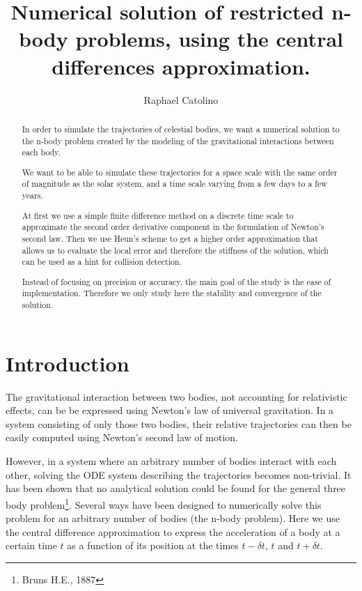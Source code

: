 \documentclass[a4paper,11pt]{article}
\author{Raphael Catolino}
\title{Numerical solution of restricted n-body problems, using
the central differences approximation.}
\begin{document}
\maketitle

\begin{abstract}
  In order to simulate the trajectories of celestial bodies,
  we want a numerical solution to the n-body problem created
  by the modeling of the gravitational interactions between each body.

  We want to be able to simulate these trajectories for a space scale
  with the same order of magnitude as the solar system, and a time scale
  varying from a few days to a few years.

  At first we use a simple finite difference method on a discrete time scale
  to approximate the second order derivative component in the formulation
  of Newton's second law. Then we use Heun's scheme to get a higher order
  approximation that allows us to evaluate the local error and therefore
  the stiffness of the solution, which can be used as a hint for collision
  detection.

  Instead of focusing on precision or accuracy, the main goal of the
  study is the ease of implementation. Therefore we only study here the
  stability and convergence of the solution.
\end{abstract}
\newpage
\tableofcontents
\newpage

\section{Introduction}
The gravitational interaction between two bodies, not accounting for relativistic
effects, can be be expressed using Newton's law of universal gravitation.
In a system consisting of only those two bodies, their relative trajectories
can then be easily computed using Newton's second law of motion.

However, in a system where an arbitrary number of bodies
interact with each other, solving the ODE system describing the
trajectories becomes non-trivial. It has been shown that no analytical solution
could be found for the general three body problem\footnote{Bruns H.E., 1887}.
Several ways have been designed to numerically solve this problem for an
arbitrary number of bodies (the n-body problem). Here we use the central difference
approximation to express the acceleration of a body at a certain time $t$ as a
function of its position at the times $t-\delta t$, $t$ and $t+\delta t$.
\end{document}
